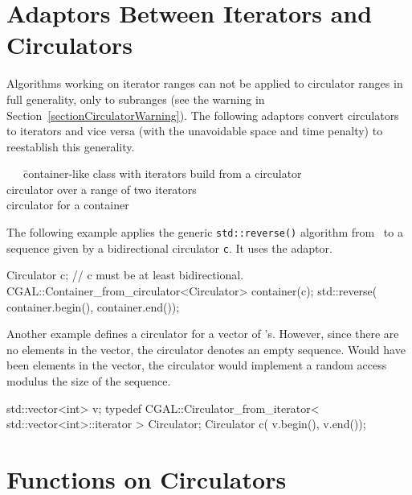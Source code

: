 \section{Adaptors Between Iterators and Circulators}
\label{sectionCirculatorAdaptor}

Algorithms working on iterator ranges can not be applied to circulator
ranges in full generality, only to subranges (see the warning in
Section~\ref{sectionCirculatorWarning}). The following adaptors
convert circulators to iterators and vice versa (with the unavoidable
space and time penalty) to reestablish this generality.


\begin{tabbing}
  \ \ \ \=
      container-like class with iterators build from a circulator\\
    \>
      circulator over a range of two iterators\\
   \>
      circulator for a container
\end{tabbing}

The following example applies the generic {\tt std::reverse()} algorithm 
from \stl\ to a sequence given by a bidirectional circulator {\tt c}.
It uses the  adaptor.

\begin{ccExampleCode}
Circulator c;  // c must be at least bidirectional.
CGAL::Container_from_circulator<Circulator> container(c);
std::reverse( container.begin(), container.end());
\end{ccExampleCode}

Another example defines a circulator  for a vector of
's. However, since there are no elements in the vector, the
circulator denotes an empty sequence. Would have been elements in the
vector, the circulator would implement a random access modulus the
size of the sequence.

\begin{ccExampleCode}
std::vector<int> v;
typedef  CGAL::Circulator_from_iterator< 
             std::vector<int>::iterator > Circulator;
Circulator c( v.begin(), v.end());
\end{ccExampleCode}

\section{Functions on Circulators}
\label{sectionCirculatorFunctions}

